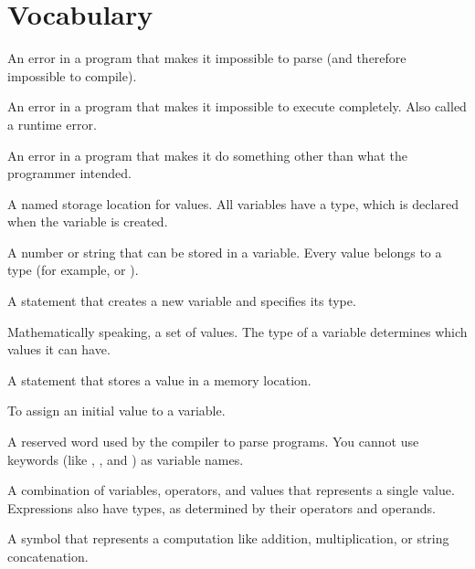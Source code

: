 \section{Vocabulary}

\begin{description}

An error in a program that makes it impossible to parse (and therefore impossible to compile).


An error in a program that makes it impossible to execute completely.
Also called a runtime error.

An error in a program that makes it do something other than what the programmer intended.

A named storage location for values.
All variables have a type, which is declared when the variable is created.

A number or string that can be stored in a variable.
Every value belongs to a type (for example,  or ).

A statement that creates a new variable and specifies its type.

Mathematically speaking, a set of values.
The type of a variable determines which values it can have.

A statement that stores a value in a memory location.



To assign an initial value to a variable.

A reserved word used by the compiler to parse programs.
You cannot use keywords (like , , and ) as variable names.

A combination of variables, operators, and values that represents a single value.
Expressions also have types, as determined by their operators and operands.

A symbol that represents a computation like addition, multiplication, or string concatenation.


\end{description}
